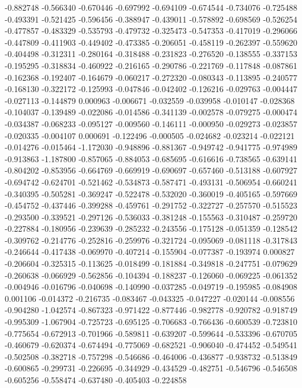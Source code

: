 -0.882748
-0.566340
-0.670446
-0.697992
-0.694109
-0.674544
-0.734076
-0.725488
-0.493391
-0.521425
-0.596456
-0.388947
-0.439011
-0.578892
-0.698569
-0.526254
-0.477857
-0.483329
-0.535793
-0.479732
-0.325473
-0.547353
-0.417019
-0.296066
-0.447809
-0.411903
-0.449402
-0.473385
-0.206051
-0.458119
-0.262397
-0.559620
-0.404498
-0.312311
-0.280164
-0.318488
-0.231823
-0.276520
-0.138555
-0.337153
-0.195295
-0.318834
-0.460922
-0.216165
-0.290786
-0.221769
-0.117848
-0.087861
-0.162368
-0.192407
-0.164679
-0.060217
-0.272320
-0.080343
-0.113895
-0.240577
-0.168130
-0.322172
-0.125993
-0.047846
-0.042402
-0.126216
-0.029763
-0.004447
-0.027113
-0.144879
0.000963
-0.006671
-0.032559
-0.039958
-0.010147
-0.028368
-0.104037
-0.139489
-0.022086
-0.014586
-0.341139
-0.002578
-0.079275
-0.000474
-0.034387
-0.068233
-0.095127
-0.009560
-0.146111
-0.000950
-0.029273
-0.023857
-0.020335
-0.004107
0.000691
-0.122496
-0.000505
-0.024682
-0.023214
-0.022121
-0.014276
-0.015464
-1.172030
-0.948896
-0.881367
-0.949742
-0.941775
-0.974989
-0.913863
-1.187800
-0.857065
-0.884053
-0.685695
-0.616616
-0.738565
-0.639141
-0.804202
-0.853956
-0.664769
-0.669919
-0.690697
-0.657460
-0.513188
-0.607927
-0.694742
-0.624701
-0.521462
-0.534873
-0.587471
-0.493131
-0.506954
-0.660241
-0.340395
-0.505281
-0.369247
-0.522478
-0.532020
-0.360019
-0.405165
-0.597669
-0.454752
-0.437446
-0.399288
-0.459761
-0.291752
-0.322727
-0.257570
-0.515523
-0.293500
-0.339521
-0.297126
-0.536033
-0.381248
-0.155563
-0.310487
-0.259720
-0.227884
-0.180956
-0.239639
-0.285232
-0.243556
-0.175128
-0.051359
-0.128542
-0.309762
-0.214776
-0.252816
-0.259976
-0.321724
-0.095069
-0.081118
-0.317843
-0.246644
-0.417438
-0.069970
-0.407214
-0.155904
-0.077387
-0.193974
0.000827
-0.206604
-0.325315
-0.113625
-0.018499
-0.181884
-0.349818
-0.247751
-0.079629
-0.260638
-0.066929
-0.562856
-0.104394
-0.188237
-0.126060
-0.069225
-0.061352
-0.004946
-0.016796
-0.040698
-0.140990
-0.037285
-0.049719
-0.195985
-0.084908
0.001106
-0.014372
-0.216735
-0.083467
-0.043325
-0.047227
-0.020144
-0.008556
-0.904280
-1.042574
-0.867323
-0.971422
-0.877446
-0.982778
-0.920782
-0.918749
-0.995309
-1.067904
-0.725723
-0.695125
-0.706683
-0.766436
-0.600539
-0.723810
-0.775654
-0.672913
-0.701966
-0.589811
-0.639207
-0.599644
-0.533396
-0.670705
-0.460679
-0.620374
-0.674494
-0.775069
-0.682521
-0.906040
-0.474452
-0.549541
-0.502508
-0.382718
-0.757298
-0.546686
-0.464006
-0.436877
-0.938732
-0.513849
-0.600865
-0.299731
-0.226695
-0.344929
-0.434529
-0.482751
-0.546796
-0.546508
-0.605256
-0.558474
-0.637480
-0.405403
-0.224858
